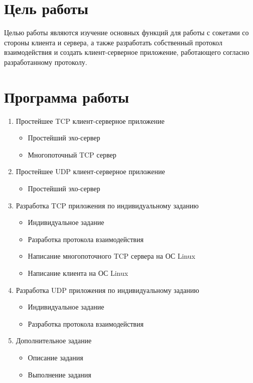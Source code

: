 







\section{Цель работы}
Целью работы являются изучение основных функций для работы с сокетами со стороны клиента и сервера, а также разработать собственный протокол взаимодействия и создать клиент-серверное приложение, работающего согласно разработанному протоколу.

\section{Программа работы}

\begin{enumerate}
\item Простейшее TCP клиент-серверное приложение
\begin{itemize}
\item Простейший эхо-сервер
\item Многопоточный TCP сервер
\end{itemize}

\item Простейшее UDP клиент-серверное приложение
\begin{itemize}
\item Простейший эхо-сервер
\end{itemize}

\item Разработка TCP приложения по индивидуальному заданию
\begin{itemize}
\item Индивидуальное задание
\item Разработка протокола взаимодействия
\item Написание многопоточного TCP сервера на ОС Linux
\item Написание клиента на ОС Linux
\end{itemize}

\item Разработка UDP приложения по индивидуальному заданию
\begin{itemize}
\item Индивидуальное задание
\item Разработка протокола взаимодействия
\end{itemize}

\item Дополнительное задание
\begin{itemize}
\item Описание задания
\item Выполнение задания
\end{itemize}
\end{enumerate}


